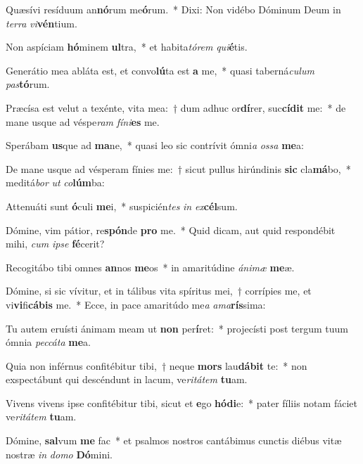\item Quæsívi resíduum an\textbf{nó}rum me\textbf{ó}rum.~* Dixi: Non vidébo Dóminum Deum in \textit{ter}\textit{ra} \textit{vi}\textbf{vén}tium.
\item Non aspíciam \textbf{hó}minem \textbf{ul}tra,~* et habita\textit{tó}\textit{rem} \textit{qui}\textbf{é}tis.
\item Generátio mea abláta est, et convo\textbf{lú}ta est \textbf{a} me,~* quasi taberná\textit{cu}\textit{lum} \textit{pas}\textbf{tó}rum.
\item Præcísa est velut a texénte, vita mea:~† dum adhuc or\textbf{dí}rer, suc\textbf{cí}\textbf{dit} me:~* de mane usque ad véspe\textit{ram} \textit{fí}\textit{ni}\textbf{es} me.
\item Sperábam \textbf{us}que ad \textbf{ma}ne,~* quasi leo sic contrívit ómni\textit{a} \textit{os}\textit{sa} \textbf{me}a:
\item De mane usque ad vésperam fínies me:~† sicut pullus hirúndinis \textbf{sic} cla\textbf{má}bo,~* meditá\textit{bor} \textit{ut} \textit{co}\textbf{lúm}ba:
\item Attenuáti sunt \textbf{ó}culi \textbf{me}i,~* suspicién\textit{tes} \textit{in} \textit{ex}\textbf{cél}sum.
\item Dómine, vim pátior, re\textbf{spón}de \textbf{pro} me.~* Quid dicam, aut quid respondébit mihi, \textit{cum} \textit{ip}\textit{se} \textbf{fé}cerit?
\item Recogitábo tibi omnes \textbf{an}nos \textbf{me}os~* in amaritúdine \textit{á}\textit{ni}\textit{mæ} \textbf{me}æ.
\item Dómine, si sic vívitur, et in tálibus vita spíritus mei,~† corrípies me, et vi\textbf{vi}fi\textbf{cá}\textbf{bis} me.~* Ecce, in pace amaritúdo me\textit{a} \textit{a}\textit{ma}\textbf{rís}sima:
\item Tu autem eruísti ánimam meam ut \textbf{non} per\textbf{í}ret:~* projecísti post tergum tuum ómnia \textit{pec}\textit{cá}\textit{ta} \textbf{me}a.
\item Quia non inférnus confitébitur tibi,~† neque \textbf{mors} lau\textbf{dá}\textbf{bit} te:~* non exspectábunt qui descéndunt in lacum, ve\textit{ri}\textit{tá}\textit{tem} \textbf{tu}am.
\item Vivens vivens ipse confitébitur tibi, sicut et \textbf{e}go \textbf{hó}\textbf{di}e:~* pater fíliis notam fáciet ve\textit{ri}\textit{tá}\textit{tem} \textbf{tu}am.
\item Dómine, \textbf{sal}vum \textbf{me} fac~* et psalmos nostros cantábimus cunctis diébus vitæ nostræ \textit{in} \textit{do}\textit{mo} \textbf{Dó}mini.
